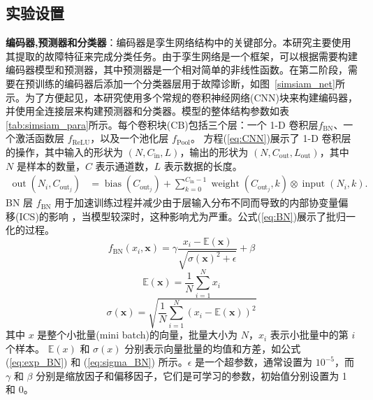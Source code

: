 \documentclass[master]{thesis-uestc}
\begin{document}

\subsection{实验设置}
\textbf{编码器,预测器和分类器}：编码器是孪生网络结构中的关键部分。本研究主要使用其提取的故障特征来完成分类任务。由于孪生网络是一个框架，可以根据需要构建编码器模型和预测器，其中预测器是一个相对简单的非线性函数。在第二阶段，需要在预训练的编码器后添加一个分类器层用于故障诊断，如图~\ref{simsiam_net}所示。为了方便起见，本研究使用多个常规的卷积神经网络(CNN)块来构建编码器，并使用全连接层来构建预测器和分类器。模型的整体结构参数如表\ref{tab:simsiam_para}所示。每个卷积块(CB)包括三个层：一个 1-D 卷积层\( f_{\text{BN}} \)、一个激活函数层 \( f_{\text{ReLU}} \)，以及一个池化层 \( f_{\text{Pool}} \)。 方程(\ref{eq:CNN})展示了 1-D 卷积层的操作，其中输入的形状为 \( (N, C_{\text{in}}, L) \)，输出的形状为 \( (N, C_{\text{out}}, L_{\text{out}}) \)，其中 \( N \) 是样本的数量，\( C \) 表示通道数，\( L \) 表示数据的长度。
\begin{equation}
    \begin{aligned}
    \operatorname{out}(N_i, C_{\mathrm{out}_j}) &= \operatorname{bias}(C_{\mathrm{out}_j}) + \sum_{k=0}^{C_{\mathrm{in}}-1} \operatorname{weight}(C_{\mathrm{out}_j}, k) \otimes \operatorname{input}(N_i, k).
    \end{aligned}
    \label{eq:CNN}
    \end{equation}
BN 层 \( f_{\text{BN}} \) 用于加速训练过程并减少由于层输入分布不同而导致的内部协变量偏移(ICS)的影响 ，当模型较深时，这种影响尤为严重。公式(\ref{eq:BN})展示了批归一化的过程。
\begin{equation}
    f_{\text{BN}}(x_i, \mathbf{x}) = \gamma \frac{x_i - \mathbb{E}(\mathbf{x})}{\sqrt{\sigma(\mathbf{x})^2 + \epsilon}} + \beta
\label{eq:BN}
\end{equation}    
\begin{equation}
\mathbb{E}(\mathbf{x}) = \frac{1}{N}\sum_{i=1}^N x_i
\label{eq:exp_BN}
\end{equation}
\begin{equation}
\sigma(\mathbf{x}) = \sqrt{\frac{1}{N}\sum_{i=1}^N (x_i - \mathbb{E}(\mathbf{x}))^2}
\label{eq:sigma_BN}
\end{equation}
其中 \( x \) 是整个小批量(mini batch)的向量，批量大小为 \( N \)，\( x_i \) 表示小批量中的第 \( i \) 个样本。  
\( \mathbb{E}(x) \) 和 \( \sigma(x) \) 分别表示向量批量的均值和方差，如公式 (\ref{eq:exp_BN}) 和 (\ref{eq:sigma_BN}) 所示。\( \epsilon \) 是一个超参数，通常设置为 \( 10^{-5} \)，而 \( \gamma \) 和 \( \beta \) 分别是缩放因子和偏移因子，它们是可学习的参数，初始值分别设置为 1 和 0。
\end{document}
